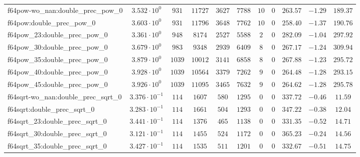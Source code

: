 \begin{tabular}{|l|c|c|c|c|c|c|c|c|c|c|}
f64pow-wo\_nan:double\_prec\_pow\_0            & $ 3.532 \cdot 10^{0}  $ & $ 931    $ & $ 11727  $ & $ 3627  $ & $ 7788   $ & $ 10  $ & $ 0 $ & $ 263.57      $ & $ -1.29   $ & $ 189.37  $ \\
f64pow:double\_prec\_pow\_0                    & $ 3.603 \cdot 10^{0}  $ & $ 931    $ & $ 11796  $ & $ 3648  $ & $ 7762   $ & $ 10  $ & $ 0 $ & $ 258.40      $ & $ -1.37   $ & $ 190.76  $ \\
f64pow\_23:double\_prec\_pow\_0                & $ 3.361 \cdot 10^{0}  $ & $ 948    $ & $ 8174   $ & $ 2527  $ & $ 5588   $ & $ 2   $ & $ 0 $ & $ 282.09      $ & $ -1.04   $ & $ 297.92  $ \\
f64pow\_30:double\_prec\_pow\_0                & $ 3.679 \cdot 10^{0}  $ & $ 983    $ & $ 9348   $ & $ 2939  $ & $ 6409   $ & $ 8   $ & $ 0 $ & $ 267.17      $ & $ -1.24   $ & $ 309.94  $ \\
f64pow\_35:double\_prec\_pow\_0                & $ 3.879 \cdot 10^{0}  $ & $ 1039   $ & $ 10012  $ & $ 3141  $ & $ 6858   $ & $ 8   $ & $ 0 $ & $ 267.88      $ & $ -1.23   $ & $ 295.72  $ \\
f64pow\_40:double\_prec\_pow\_0                & $ 3.928 \cdot 10^{0}  $ & $ 1039   $ & $ 10564  $ & $ 3379  $ & $ 7262   $ & $ 9   $ & $ 0 $ & $ 264.48      $ & $ -1.28   $ & $ 293.15  $ \\
f64pow\_45:double\_prec\_pow\_0                & $ 3.926 \cdot 10^{0}  $ & $ 1039   $ & $ 11095  $ & $ 3465  $ & $ 7632   $ & $ 9   $ & $ 0 $ & $ 264.62      $ & $ -1.28   $ & $ 295.78  $ \\
f64sqrt-wo\_nan:double\_prec\_sqrt\_0          & $ 3.376 \cdot 10^{-1} $ & $ 114    $ & $ 1607   $ & $ 580   $ & $ 1295   $ & $ 0   $ & $ 0 $ & $ 337.72      $ & $ -0.46   $ & $ 11.59   $ \\
f64sqrt:double\_prec\_sqrt\_0                  & $ 3.283 \cdot 10^{-1} $ & $ 114    $ & $ 1661   $ & $ 504   $ & $ 1293   $ & $ 0   $ & $ 0 $ & $ 347.22      $ & $ -0.38   $ & $ 12.04   $ \\
f64sqrt\_23:double\_prec\_sqrt\_0              & $ 3.441 \cdot 10^{-1} $ & $ 114    $ & $ 1376   $ & $ 465   $ & $ 1138   $ & $ 0   $ & $ 0 $ & $ 331.35      $ & $ -0.52   $ & $ 14.71   $ \\
f64sqrt\_30:double\_prec\_sqrt\_0              & $ 3.121 \cdot 10^{-1} $ & $ 114    $ & $ 1455   $ & $ 524   $ & $ 1172   $ & $ 0   $ & $ 0 $ & $ 365.23      $ & $ -0.24   $ & $ 14.56   $ \\
f64sqrt\_35:double\_prec\_sqrt\_0              & $ 3.427 \cdot 10^{-1} $ & $ 114    $ & $ 1535   $ & $ 511   $ & $ 1201   $ & $ 0   $ & $ 0 $ & $ 332.67      $ & $ -0.51   $ & $ 14.75   $ \\

\end{tabular}

